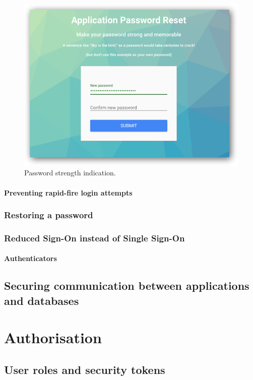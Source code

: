 \documentclass[a4paper,12pt,oneside,openright]{memoir}
\begin{document}
	\begin{figure}[h!tbp]
	\centering
	\includegraphics[width=0.7\linewidth]{images/03-new-user-setting-up-password.png}
	\caption{Password strength indication.}\label{sec:02:fig:1}
	\end{figure}

\paragraph*{Preventing rapid-fire login attempts}

\subsubsection*{Restoring a password}


\subsubsection*{Reduced Sign-On instead of Single Sign-On}

\paragraph*{Authenticators}


\subsection*{Securing communication between applications and databases}


\section*{Authorisation}\label{sec:03}

\subsection*{User roles and security tokens}
\end{document}
